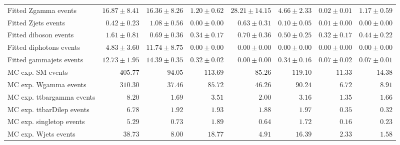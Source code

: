 \begin{table}
\begin{center}
{\begin{tabular*}{\textwidth}{@{\extracolsep{\fill}}lrrrrrrr}
        Fitted Zgamma events         & $16.87 \pm 8.41$          & $16.36 \pm 8.26$          & $1.20 \pm 0.62$          & $28.21 \pm 14.15$          & $4.66 \pm 2.33$          & $0.02 \pm 0.01$          & $1.17 \pm 0.59$              \\
        Fitted Zjets events         & $0.42 \pm 0.23$          & $1.08 \pm 0.56$          & $0.00 \pm 0.00$          & $0.63 \pm 0.31$          & $0.10 \pm 0.05$          & $0.01 \pm 0.00$          & $0.00 \pm 0.00$              \\
        Fitted diboson events         & $1.61 \pm 0.81$          & $0.69 \pm 0.36$          & $0.34 \pm 0.17$          & $0.70 \pm 0.36$          & $0.50 \pm 0.25$          & $0.32 \pm 0.17$          & $0.44 \pm 0.22$              \\
        Fitted diphotons events         & $4.83 \pm 3.60$          & $11.74 \pm 8.75$          & $0.00 \pm 0.00$          & $0.00 \pm 0.00$          & $0.00 \pm 0.00$          & $0.00 \pm 0.00$          & $0.00 \pm 0.00$              \\
        Fitted gammajets events         & $12.73 \pm 1.95$          & $14.39 \pm 0.35$          & $0.32 \pm 0.02$          & $0.00 \pm 0.00$          & $0.34 \pm 0.16$          & $0.07 \pm 0.02$          & $0.07 \pm 0.01$              \\
 \noalign{\smallskip}\hline\noalign{\smallskip}
MC exp. SM events              & $405.77$          & $94.05$          & $113.69$          & $85.26$          & $119.10$          & $11.33$          & $14.38$              \\
\noalign{\smallskip}\hline\noalign{\smallskip}
        MC exp. Wgamma events         & $310.30$          & $37.46$          & $85.72$          & $46.26$          & $90.24$          & $6.72$          & $8.91$              \\
        MC exp. ttbargamma events         & $8.20$          & $1.69$          & $3.51$          & $2.00$          & $3.16$          & $1.35$          & $1.66$              \\
        MC exp. ttbarDilep events         & $6.78$          & $1.92$          & $1.93$          & $1.88$          & $1.97$          & $0.35$          & $0.32$              \\
        MC exp. singletop events         & $5.29$          & $0.73$          & $1.89$          & $0.64$          & $1.72$          & $0.16$          & $0.23$              \\
        MC exp. Wjets events         & $38.73$          & $8.00$          & $18.77$          & $4.91$          & $16.39$          & $2.33$          & $1.58$              \\

\end{tabular*}}
\end{center}
\end{table}
